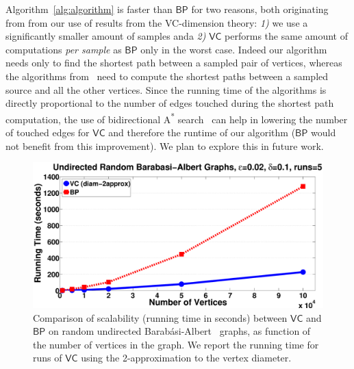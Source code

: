  Algorithm~\ref{alg:algorithm} is faster than $\mathsf{BP}$ for two reasons, both
 originating from from our use of results from the VC-dimension theory:
 \emph{1)} we use a significantly smaller amount of samples anda \emph{2)}
 $\mathsf{VC}$ performs the same amount of computations \emph{per sample} as
 $\mathsf{BP}$ only in the worst case. Indeed our algorithm needs only to find
 the shortest path between a sampled pair of vertices, whereas the algorithms
from~\citep{GeisbergerSS08,BrandesP07} need to compute the shortest paths
between a sampled source and all the other vertices. Since the running time of
the algorithms is directly proportional to the number of edges touched during
the shortest path computation, the use of bidirectional A\textsuperscript{*}
search~\citep{Pohl69,KaindlK97} can help in lowering the number of touched edges
for $\mathsf{VC}$ and therefore the runtime of our algorithm ($\mathsf{BP}$
would not benefit from this improvement). %
\ifdmkd
\else
We plan to explore this in future work.
\fi

\begin{figure}[htb]
  \centering
  \includegraphics[width=1\textwidth,keepaspectratio]{figures/eps/random-time}
  \caption{Comparison of scalability (running time in seconds) between
  	  $\mathsf{VC}$ and $\mathsf{BP}$ on random undirected
  	  Barab\'asi-Albert~\citep{BarabasiA99} graphs, as function of the number of
	  vertices in the graph. We report the running time for runs of $\mathsf{VC}$ using
	  the 2-approximation to the vertex diameter.}
  \label{fig:random:time}
\end{figure}
